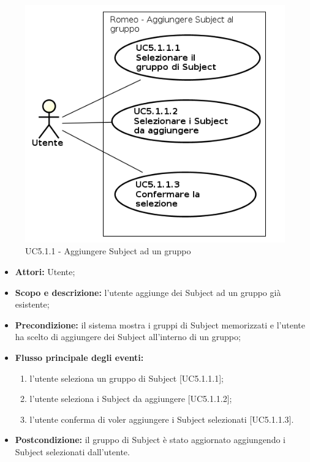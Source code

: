 \begin{figure}[!h]
\begin{center}
\includegraphics[scale=0.6]{./img/Use_Case/UC5_1_1}
\caption{UC5.1.1 - Aggiungere Subject ad un gruppo}
\end{center}
\end{figure}
\begin{itemize}
\item \textbf{Attori:} Utente;
\item \textbf{Scopo e descrizione:} l'utente aggiunge dei Subject\glossario{} ad un gruppo già esistente;
\item \textbf{Precondizione:} il sistema mostra i gruppi di Subject\glossario{} memorizzati e l'utente ha scelto di aggiungere dei Subject\glossario{} all'interno di un gruppo;
\item \textbf{Flusso principale degli eventi:}
\begin{enumerate}
\item l'utente seleziona un gruppo di Subject\glossario{} [UC5.1.1.1];
\item l'utente seleziona i Subject\glossario{} da aggiungere [UC5.1.1.2];
\item l'utente conferma di voler aggiungere i Subject\glossario{} selezionati [UC5.1.1.3].
\end{enumerate}
\item \textbf{Postcondizione:} il gruppo di Subject\glossario{} è stato aggiornato aggiungendo i Subject\glossario{} selezionati dall'utente.
\end{itemize}


